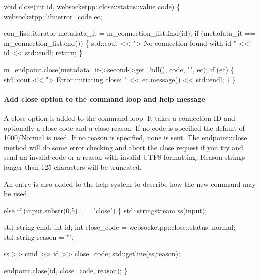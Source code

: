 \begin{DoxyCode}
\textcolor{keywordtype}{void} close(\textcolor{keywordtype}{int} \textcolor{keywordtype}{id}, \hyperlink{namespacewebsocketpp_1_1close_1_1status_a8614a5c4733d708e2d2a32191c5bef84}{websocketpp::close::status::value} code) \{
    websocketpp::lib::error\_code ec;

    con\_list::iterator metadata\_it = m\_connection\_list.find(\textcolor{keywordtype}{id});
    \textcolor{keywordflow}{if} (metadata\_it == m\_connection\_list.end()) \{
        std::cout << \textcolor{stringliteral}{"> No connection found with id "} << \textcolor{keywordtype}{id} << std::endl;
        \textcolor{keywordflow}{return};
    \}

    m\_endpoint.close(metadata\_it->second->get\_hdl(), code, \textcolor{stringliteral}{""}, ec);
    \textcolor{keywordflow}{if} (ec) \{
        std::cout << \textcolor{stringliteral}{"> Error initiating close: "} << ec.message() << std::endl;
    \}
\}
\end{DoxyCode}


\paragraph*{Add close option to the command loop and help message}

A close option is added to the command loop. It takes a connection ID and optionally a close code and a close reason. If no code is specified the default of 1000/\+Normal is used. If no reason is specified, none is sent. The {\ttfamily endpoint\+::close} method will do some error checking and abort the close request if you try and send an invalid code or a reason with invalid U\+T\+F8 formatting. Reason strings longer than 125 characters will be truncated.

An entry is also added to the help system to describe how the new command may be used.


\begin{DoxyCode}
\textcolor{keywordflow}{else} \textcolor{keywordflow}{if} (input.substr(0,5) == \textcolor{stringliteral}{"close"}) \{
    std::stringstream ss(input);

    std::string cmd;
    \textcolor{keywordtype}{int} id;
    \textcolor{keywordtype}{int} close\_code = websocketpp::close::status::normal;
    std::string reason = \textcolor{stringliteral}{""};

    ss >> cmd >> \textcolor{keywordtype}{id} >> close\_code;
    std::getline(ss,reason);

    endpoint.close(\textcolor{keywordtype}{id}, close\_code, reason);
\}
\end{DoxyCode}


